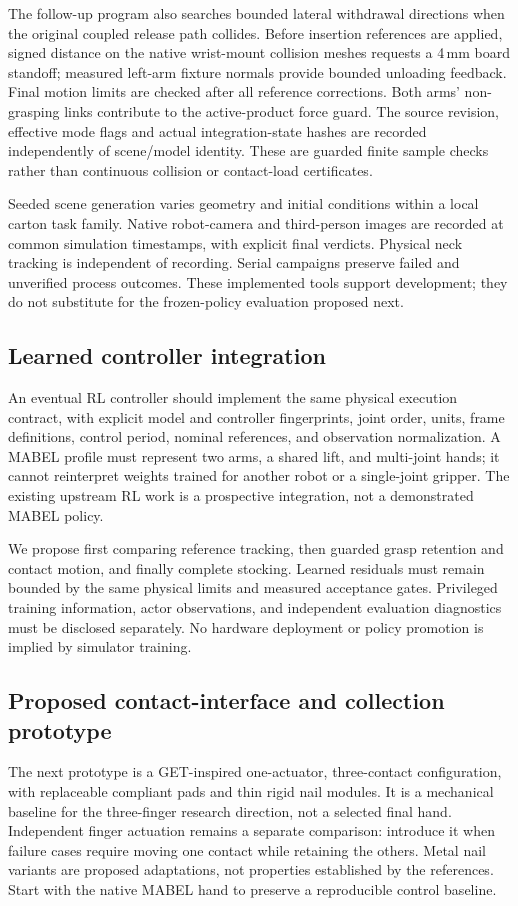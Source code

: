 The follow-up program also searches bounded lateral withdrawal directions when
the original coupled release path collides. Before insertion references are
applied, signed distance on the native wrist-mount collision meshes requests a
4\,mm board standoff; measured left-arm fixture normals provide bounded unloading
feedback. Final motion limits are checked after all reference corrections.
Both arms' non-grasping links contribute to the active-product force guard.
The source revision, effective mode flags and actual integration-state hashes
are recorded independently of scene/model identity. These are guarded finite
sample checks rather than continuous collision or contact-load certificates.

Seeded scene generation varies geometry and initial conditions within a local
carton task family. Native robot-camera and third-person images are recorded
at common simulation timestamps, with explicit final verdicts. Physical neck
tracking is independent of recording. Serial campaigns preserve failed and
unverified process outcomes. These implemented tools support development; they
do not substitute for the frozen-policy evaluation proposed next.

\subsection{Learned controller integration}
An eventual RL controller should implement the same physical execution contract,
with explicit model and controller fingerprints, joint order, units, frame
definitions, control period, nominal references, and observation normalization.
A MABEL profile must represent two arms, a shared lift, and multi-joint hands;
it cannot reinterpret weights trained for another robot or a single-joint gripper.
The existing upstream RL work is a prospective integration, not a demonstrated
MABEL policy.

We propose first comparing reference tracking, then guarded grasp retention and
contact motion, and finally complete stocking. Learned residuals must remain
bounded by the same physical limits and measured acceptance gates. Privileged
training information, actor observations, and independent evaluation diagnostics
must be disclosed separately. No hardware deployment or policy promotion is
implied by simulator training.

\subsection{Proposed contact-interface and collection prototype}
The next prototype is a GET-inspired one-actuator, three-contact configuration,
with replaceable compliant pads and thin rigid nail modules. It is a mechanical
baseline for the three-finger research direction, not a selected final hand.
Independent finger actuation remains a separate comparison: introduce it when
failure cases require moving one contact while retaining the others. Metal nail
variants are proposed adaptations, not properties established by the references.
Start with the native MABEL hand to preserve a reproducible control baseline.

